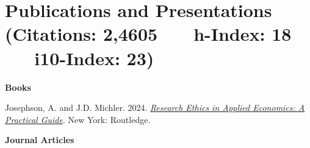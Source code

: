 \documentclass[letterpaper]{article}
\renewenvironment{itemize}{
  \begin{list}
  	{}{
    \setlength{\leftmargin}{1.5em}
    \setlength{\itemsep}{-.5em}
  }
}{
  \end{list}
}
\begin{document}
\section*{\sc Publications and Presentations \small (Citations: 2,4605 \ \ \ h-Index: 18 \ \ \ i10-Index: 23)} 

\begin{itemize}
\item {\bf Books}
	
\leftskip 0.25in
\parindent -0.5in
\subitem Josephson, A. and J.D. Michler. 2024. \href{https://www.routledge.com/Research-Ethics-in-Applied-Economics-A-Practical-Guide/Josephson-Michler/p/book/9780367457419}{\emph{Research Ethics in Applied Economics: A Practical Guide}}. New York: Routledge. \\

\newpage
\leftskip 0in
\item {\bf Journal Articles}


\end{itemize}
\end{document}
